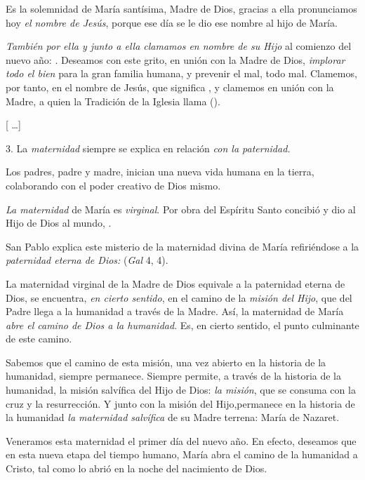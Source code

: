 \begin{body}
	Es la solemnidad de María santísima, Madre de Dios, gracias a ella pronunciamos hoy \emph{el nombre de Jesús}, porque ese día se le dio ese nombre al hijo de María.

	\emph{También por ella y junto a ella clamamos en nombre de su Hijo} al comienzo del nuevo año: . Deseamos con este grito, en unión con la Madre de Dios, \emph{implorar todo el bien} para la gran familia humana, y prevenir el mal, todo mal. Clamemos, por tanto, en el nombre de Jesús, que significa , y clamemos en unión con la Madre, a quien la Tradición de la Iglesia llama  ().

	{[} \ldots{}{]}

	3. La \emph{maternidad} siempre se explica en relación \emph{con la 	paternidad.}

	Los padres, padre y madre, inician una nueva vida humana en la tierra, colaborando con el poder creativo de Dios mismo.

	\emph{La maternidad} de María es \emph{virginal}. Por obra del Espíritu Santo concibió y dio al Hijo de Dios al mundo, .

	San Pablo explica este misterio de la maternidad divina de María refiriéndose a la \emph{paternidad eterna de Dios:}  (\emph{Gal} 4, 4).

	La maternidad virginal de la Madre de Dios equivale a la paternidad eterna de Dios, se encuentra, \emph{en cierto sentido}, en el camino de la \emph{misión del Hijo}, que del Padre llega a la humanidad a través de la Madre. Así, la maternidad de María \emph{abre el camino de Dios a 	la humanidad}. Es, en cierto sentido, el punto culminante de este camino.

	Sabemos que el camino de esta misión, una vez abierto en la historia de la humanidad, siempre permanece. Siempre permite, a través de la historia de la humanidad, la misión salvífica del Hijo de Dios: \emph{la 	misión}, que se consuma con la cruz y la resurrección. Y junto con la misión del Hijo,permanece en la historia de la humanidad \emph{la 	maternidad salvífica} de su Madre terrena: María de Nazaret.

	Veneramos esta maternidad el primer día del nuevo año. En efecto, deseamos que en esta nueva etapa del tiempo humano, María abra el camino de la humanidad a Cristo, tal como lo abrió en la noche del nacimiento de Dios.


\end{body}
